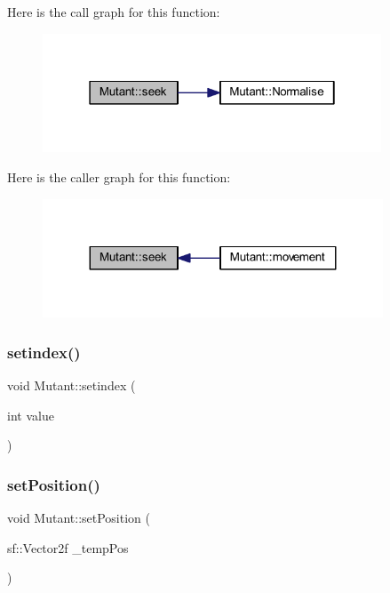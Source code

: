 Here is the call graph for this function\+:
\nopagebreak
\begin{figure}[H]
\begin{center}
\leavevmode
\includegraphics[width=286pt]{class_mutant_a24699eb054b6cf95f66bf3e856364b71_cgraph}
\end{center}
\end{figure}
Here is the caller graph for this function\+:
\nopagebreak
\begin{figure}[H]
\begin{center}
\leavevmode
\includegraphics[width=287pt]{class_mutant_a24699eb054b6cf95f66bf3e856364b71_icgraph}
\end{center}
\end{figure}
\mbox{\label{class_mutant_a66e452c4f98ebaed704b29127403d3d9}} 
\subsubsection{\texorpdfstring{setindex()}{setindex()}}
{\footnotesize\ttfamily void Mutant\+::setindex (\begin{DoxyParamCaption}\item[{int}]{value }\end{DoxyParamCaption})}

\mbox{\label{class_mutant_af815ec529e98bf10daa9ac346c87f4d0}} 
\subsubsection{\texorpdfstring{set\+Position()}{setPosition()}}
{\footnotesize\ttfamily void Mutant\+::set\+Position (\begin{DoxyParamCaption}\item[{sf\+::\+Vector2f}]{\+\_\+temp\+Pos }\end{DoxyParamCaption})}

